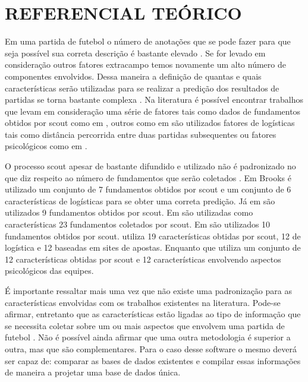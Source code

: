 \newpage
\section{REFERENCIAL TEÓRICO}
Em uma partida de futebol o número de anotações que se pode fazer para que seja possível sua correta descrição é bastante elevado \cite{Constantinou2013}. Se for levado em consideração outros fatores extracampo temos novamente um alto número de componentes envolvidos. Dessa maneira a definição de quantas e quais características serão utilizadas para se realizar a predição dos resultados de partidas se torna bastante complexa \cite{Tax2015}. Na literatura é possível encontrar trabalhos que levam em consideração uma série de fatores tais como dados de fundamentos obtidos por scout como em , outros como em  são utilizados fatores de logísticas tais como distância percorrida entre duas partidas subsequentes \cite{Tax2015} ou fatores psicológicos como em .

O processo scout apesar de bastante difundido e utilizado não é padronizado no que diz respeito ao número de fundamentos que serão coletados \cite{Pendharkar2000}. Em Brooks \cite{Brooks2016} é utilizado um conjunto de 7 fundamentos obtidos por scout e um conjunto de 6 características de logísticas para se obter uma correta predição. Já em  são utilizados 9 fundamentos obtidos por scout. Em  são utilizadas como características 23 fundamentos coletados por scout. Em  são utilizados 10 fundamentos obtidos por scout.  utiliza 19 características obtidas por scout, 12 de logística e 12 baseadas em sites de apostas. Enquanto que  utiliza um conjunto de 12 características obtidas por scout e 12 características envolvendo aspectos psicológicos das equipes. 
 
É importante ressaltar mais uma vez que não existe uma padronização para as características envolvidas com os trabalhos existentes na literatura. Pode-se afirmar, entretanto que as características estão ligadas ao tipo de informação que se necessita coletar sobre um ou mais aspectos que envolvem uma partida de futebol \cite{Tax2015}. Não é possível ainda afirmar que uma outra metodologia é superior a outra, mas que são complementares. Para o caso desse software o mesmo deverá ser capaz de: comparar as bases de dados existentes e compilar essas informações de maneira a projetar uma base de dados única.